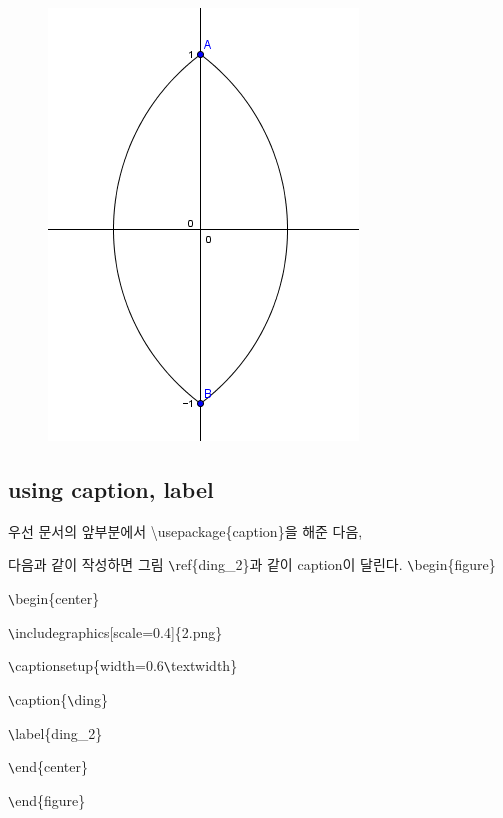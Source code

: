 \documentclass[11pt]{article}
\begin{document}
\begin{figure}
	\begin{center}
		\includegraphics[scale=0.4]{1.png}
	\end{center}
\end{figure}

\longline

\subsection{using caption, label}
우선 문서의 앞부분에서 \textbackslash usepackage\{caption\}을 해준 다음,

다음과 같이 작성하면 그림 \verb+\+ref\{ding\_2\}과 같이 caption이 달린다.
\verb+\+begin\{figure\}

\verb+\+begin\{center\}

\verb+\+includegraphics[scale=0.4]\{2.png\}

\verb+\+captionsetup\{width=0.6\verb+\+textwidth\}

\verb+\+caption\{\verb+\+ding\}

\verb+\+label\{ding\_2\}

\verb+\+end\{center\}

\verb+\+end\{figure\}
\end{document}
